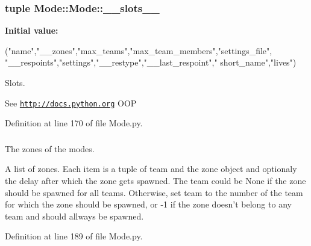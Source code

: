 \hypertarget{class_mode_1_1_mode_a66261cd58aee501bf7bf1b7c9dbba201}{
\subsubsection[{\-\_\-\-\_\-slots\-\_\-\-\_\-}]{\setlength{\rightskip}{0pt plus 5cm}tuple {\bf \-Mode\-::\-Mode\-::\-\_\-\-\_\-slots\-\_\-\-\_\-}}}
\label{class_mode_1_1_mode_a66261cd58aee501bf7bf1b7c9dbba201}
{\bfseries \-Initial value\-:}
\begin{DoxyCode}
("name","__zones","max_teams","max_team_members","settings_file",
               "__respoints","settings","__restype","__last_respoint","
      short_name","lives")
\end{DoxyCode}


\-Slots. 

\-See \href{http://docs.python.org}{\tt http\-://docs.\-python.\-org} \-O\-O\-P 

\-Definition at line 170 of file \-Mode.\-py.

\hypertarget{class_mode_1_1_mode_ad9e5c42d7d8f5870e51eb5289f45a0c4}{
\subsubsection[{\-\_\-\-\_\-zones}]{}}
\label{class_mode_1_1_mode_ad9e5c42d7d8f5870e51eb5289f45a0c4}


\-The zones of the modes. 

\-A list of zones. \-Each item is a tuple of team and the zone object and optionaly the delay after which the zone gets spawned. \-The team could be \-None if the zone should be spawned for all teams. \-Otherwise, set team to the number of the team for which the zone should be spawned, or -\/1 if the zone doesn't belong to any team and should allways be spawned. 

\-Definition at line 189 of file \-Mode.\-py.

